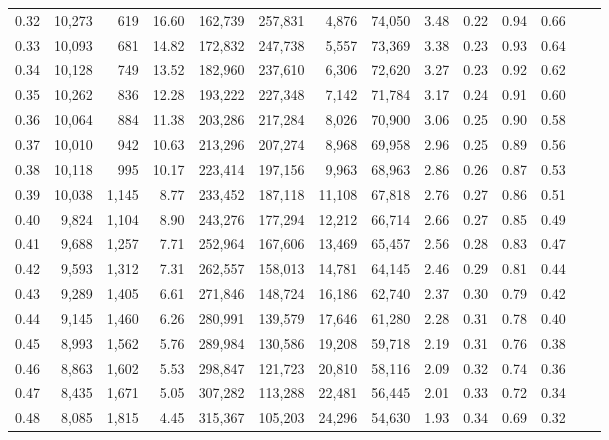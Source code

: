 \begin{tabular}{rrrrrrrrrrrrrr}
0.32 &  10,273 &    619 &   16.60 &  162,739 &  257,831 &   4,876 &  74,050 &  3.48 &  0.22 &  0.94 &      0.66 \\
0.33 &  10,093 &    681 &   14.82 &  172,832 &  247,738 &   5,557 &  73,369 &  3.38 &  0.23 &  0.93 &      0.64 \\
0.34 &  10,128 &    749 &   13.52 &  182,960 &  237,610 &   6,306 &  72,620 &  3.27 &  0.23 &  0.92 &      0.62 \\
0.35 &  10,262 &    836 &   12.28 &  193,222 &  227,348 &   7,142 &  71,784 &  3.17 &  0.24 &  0.91 &      0.60 \\
0.36 &  10,064 &    884 &   11.38 &  203,286 &  217,284 &   8,026 &  70,900 &  3.06 &  0.25 &  0.90 &      0.58 \\
0.37 &  10,010 &    942 &   10.63 &  213,296 &  207,274 &   8,968 &  69,958 &  2.96 &  0.25 &  0.89 &      0.56 \\
0.38 &  10,118 &    995 &   10.17 &  223,414 &  197,156 &   9,963 &  68,963 &  2.86 &  0.26 &  0.87 &      0.53 \\
0.39 &  10,038 &  1,145 &    8.77 &  233,452 &  187,118 &  11,108 &  67,818 &  2.76 &  0.27 &  0.86 &      0.51 \\
0.40 &   9,824 &  1,104 &    8.90 &  243,276 &  177,294 &  12,212 &  66,714 &  2.66 &  0.27 &  0.85 &      0.49 \\
0.41 &   9,688 &  1,257 &    7.71 &  252,964 &  167,606 &  13,469 &  65,457 &  2.56 &  0.28 &  0.83 &      0.47 \\
0.42 &   9,593 &  1,312 &    7.31 &  262,557 &  158,013 &  14,781 &  64,145 &  2.46 &  0.29 &  0.81 &      0.44 \\
0.43 &   9,289 &  1,405 &    6.61 &  271,846 &  148,724 &  16,186 &  62,740 &  2.37 &  0.30 &  0.79 &      0.42 \\
0.44 &   9,145 &  1,460 &    6.26 &  280,991 &  139,579 &  17,646 &  61,280 &  2.28 &  0.31 &  0.78 &      0.40 \\
0.45 &   8,993 &  1,562 &    5.76 &  289,984 &  130,586 &  19,208 &  59,718 &  2.19 &  0.31 &  0.76 &      0.38 \\
0.46 &   8,863 &  1,602 &    5.53 &  298,847 &  121,723 &  20,810 &  58,116 &  2.09 &  0.32 &  0.74 &      0.36 \\
0.47 &   8,435 &  1,671 &    5.05 &  307,282 &  113,288 &  22,481 &  56,445 &  2.01 &  0.33 &  0.72 &      0.34 \\
0.48 &   8,085 &  1,815 &    4.45 &  315,367 &  105,203 &  24,296 &  54,630 &  1.93 &  0.34 &  0.69 &      0.32 \\

\end{tabular}
